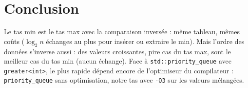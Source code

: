 \documentclass[11pt,a4paper]{article}
\begin{document}
\section{Conclusion}

Le tas min est le tas max avec la comparaison inversée : même tableau, mêmes coûts
($\log_2 n$ échanges au plus pour insérer ou extraire le min). Mais l'ordre des données
s'inverse aussi : des valeurs croissantes, pire cas du tas max, sont le meilleur cas du tas
min (aucun échange). Face à \texttt{std::priority\_queue} avec \texttt{greater<int>}, le plus
rapide dépend encore de l'optimiseur du compilateur : \texttt{priority\_queue} sans
optimisation, notre tas avec \texttt{-O3} sur les valeurs mélangées.
\end{document}
